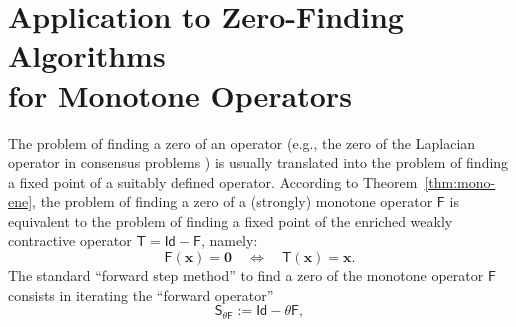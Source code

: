 \documentclass[journal,twoside,web]{ieeecolor}
\newcommand{\virg}[1]{``#1''}
\newcommand{\xb}{\boldsymbol{x}}
\newcommand{\Fs}{\mathsf{F}}
\newcommand{\Ss}{\mathsf{S}}
\newcommand{\Ts}{\mathsf{T}}
\newcommand{\Is}{\mathsf{Id}}
\newcommand{\bzero}{\boldsymbol{0}}
\newcommand{\fix}{\mathrm{fix}}
\newtheorem{rem}{Remark}
\begin{document}







\section{Application to Zero-Finding Algorithms\\ for Monotone Operators}\label{sec:app1}
%
The problem of finding a zero of an operator (e.g., the zero of the Laplacian operator in consensus problems \cite{bondy2008graph,Deplano20,bronski2014spectral,devries2018kernel,qu2025controllability}) is usually translated into the problem of finding a fixed point of a suitably defined operator. According to Theorem~\ref{thm:mono-ene}, the problem of finding a zero of a (strongly) monotone operator $\Fs$ is equivalent to the problem of finding a fixed point of the enriched weakly contractive operator $\Ts=\Is-\Fs$, namely:
%
$$
\Fs(\xb) = \bzero \quad \Leftrightarrow \quad \Ts(\xb) = \xb.
$$
%
The standard \virg{forward step method} to find a zero of the monotone operator $\Fs$ consists in iterating the \virg{forward operator}
%
\begin{equation}\label{eq:fsm}
    \Ss_{\theta\Fs} := \Is-\theta \Fs,
\end{equation}
%
\end{document}
